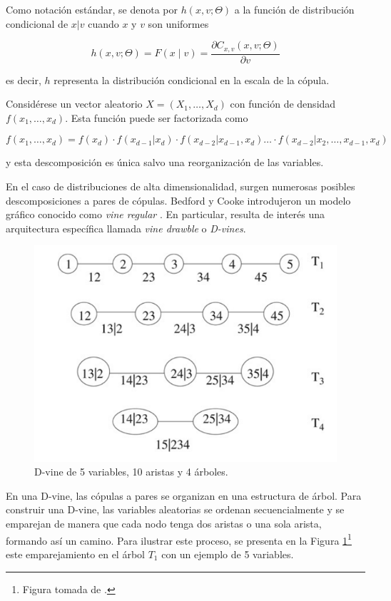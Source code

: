 Como notación estándar, se denota por $h(x, v; \Theta)$ a la función de distribución condicional de $x|v$ cuando $x$ y $v$ son uniformes

\begin{equation}\label{funH}
    h(x, v; \Theta) = F(x \mid v)=\frac{\partial C_{x, v}(x, v; \Theta)}{\partial v}
\end{equation}

es decir, $h$ representa la distribución condicional en la escala de la cópula.

Considérese un vector aleatorio $X = (X_1, \dots, X_d)$ con función de densidad $f(x_1, \dots, x_d)$. Esta función puede ser factorizada como

\begin{equation}\label{fact1}
    f(x_1, \dots, x_d) = f(x_d) \cdot f(x_{d-1}|x_d) \cdot f(x_{d-2} | x_{d-1}, x_{d}) \dots \cdot  f(x_{d-2} | x_{2}, \dots, x_{d-1}, x_{d})
\end{equation}

 y esta descomposición es única salvo una reorganización de las variables.

En el caso de distribuciones de alta dimensionalidad, surgen numerosas posibles descomposiciones a pares de cópulas. Bedford y Cooke  introdujeron un modelo gráfico conocido como \textit{vine regular} \cite{Bedford2001}. En particular, resulta de interés una arquitectura específica llamada \textit{vine drawble} o \textit{D-vines}.

\begin{figure}[H]
    \centering
    \includegraphics[width = 0.6 \textwidth]{Imagenes/Dvine5var.png}
    \caption{D-vine de 5 variables, 10 aristas y 4 árboles.}
    \label{fig:Dvine5}
\end{figure}

En una D-vine, las cópulas a pares se organizan en una estructura de árbol. Para construir una D-vine, las variables aleatorias se ordenan secuencialmente y se emparejan de manera que cada nodo tenga dos aristas o una sola arista, formando así un camino. Para ilustrar este proceso, se presenta en la Figura \ref{fig:Dvine5}\footnote{Figura tomada de \cite{PairCopula}.} este emparejamiento en el árbol $T_1$ con un ejemplo de 5 variables.

